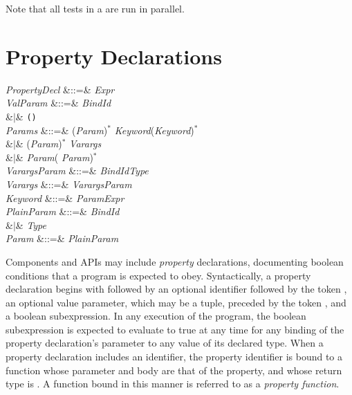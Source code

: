 Note that all tests in a  are run in parallel.

\section{Property Declarations}

\begin{Grammar}
\emph{PropertyDecl} &::=&  
 \emph{Expr} \\

\emph{ValParam} &::=& \emph{BindId}\\
&$|$& \texttt(\texttt)\\

\emph{Params}
&::=& (\emph{Param}\EXP{,})$^*$  \emph{Keyword}(\EXP{,}\emph{Keyword})$^*$\\
&$|$& (\emph{Param}\EXP{,})$^*$  \emph{Varargs}\\
&$|$& \emph{Param}(\EXP{,} \emph{Param})$^*$\\

\emph{VarargsParam} &::=& \emph{BindId}\EXP{\COLONOP}\emph{Type} \\

\emph{Varargs} &::=& \emph{VarargsParam}\\

\emph{Keyword} &::=& \emph{Param}\EXP{=}\emph{Expr} \\

\emph{PlainParam} &::=& \emph{BindId}  \\
&$|$& \emph{Type} \\

\emph{Param} &::=& \emph{PlainParam}\\

\end{Grammar}

Components and APIs may include \emph{property}
declarations, documenting
boolean conditions that a program is expected to obey.
Syntactically, a property declaration begins with
 followed by an optional identifier followed by the token
\EXP{=}, an optional value parameter, which may be a tuple, preceded by the
token \EXP{\forall}, and a boolean subexpression.
In any execution of the program, the boolean subexpression is expected to
evaluate to true at any time for any binding of the property declaration's
parameter to any value of its declared type.
When a property declaration includes an identifier,
the property identifier is bound to a function whose parameter
and body are that of the property, and whose return type is .
A function bound in this manner is referred to as a \emph{property function}.


